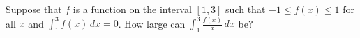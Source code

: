 Suppose that $f$ is a function on the interval $[1,3]$ such that $-1 \leq f(x) \leq 1$ for all $x$ and $\int_1^3 f(x)\,dx = 0$. How large can $\int_1^3 \frac{f(x)}{x}\,dx$ be?

\,
